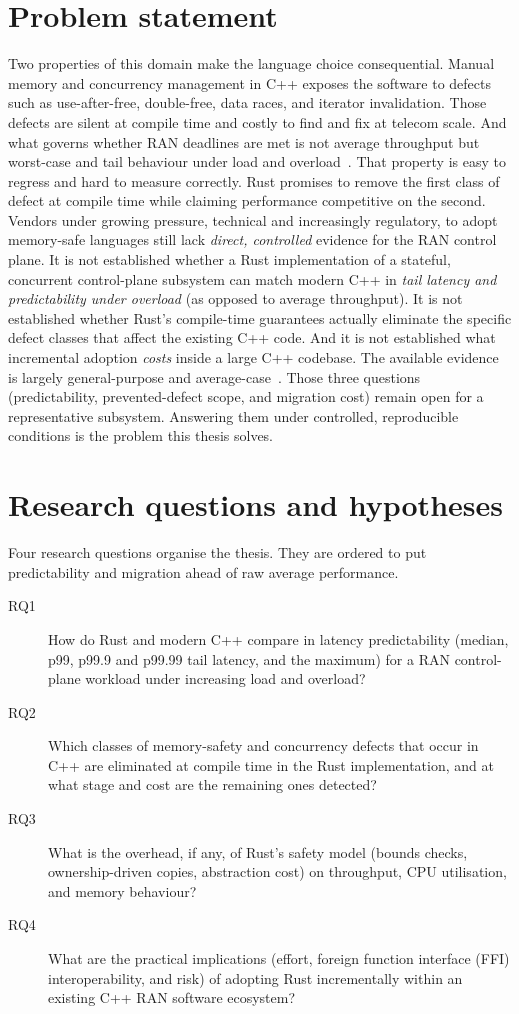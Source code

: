 \documentclass[english,oneside,a4paper,censored,csm,software-track-2020]{HYthesisML}
\begin{document}
\section{Problem statement}
Two properties of this domain make the language choice consequential. Manual memory and
concurrency management in C++ exposes the software to defects such as use-after-free,
double-free, data races, and iterator invalidation. Those defects are silent at compile time and
costly to find and fix at telecom scale. And what governs whether RAN deadlines are met is not
average throughput but worst-case and tail behaviour under load and
overload~\cite{dean2013tail}. That property is easy to regress and hard to measure correctly.
Rust promises to remove the first class of defect at compile time while claiming performance
competitive on the second. Vendors under growing pressure, technical and increasingly
regulatory, to adopt memory-safe languages still lack \emph{direct, controlled} evidence for the
RAN control plane. It is not established whether a Rust implementation of a stateful, concurrent
control-plane subsystem can match modern C++ in \emph{tail latency and predictability under
overload} (as opposed to average throughput). It is not established whether Rust's
compile-time guarantees actually eliminate the specific defect classes that affect the
existing C++ code. And it is not established what incremental adoption \emph{costs} inside a
large C++ codebase. The available evidence is largely general-purpose and
average-case~\cite{balasubramanian2017rust,qin2020rust}. Those three questions (predictability,
prevented-defect scope, and migration cost) remain open for a representative subsystem.
Answering them under controlled, reproducible conditions is the problem this thesis solves.

\section{Research questions and hypotheses}\label{sec:rqs}
Four research questions organise the thesis. They are ordered to put predictability and
migration ahead of raw average performance.

\begin{description}
  \item[RQ1] How do Rust and modern C++ compare in latency predictability (median, p99,
        p99.9 and p99.99 tail latency, and the maximum) for a RAN control-plane workload
        under increasing load and overload?
  \item[RQ2] Which classes of memory-safety and concurrency defects that occur in C++ are
        eliminated at compile time in the Rust implementation, and at what stage and cost
        are the remaining ones detected?
  \item[RQ3] What is the overhead, if any, of Rust's safety model (bounds checks,
        ownership-driven copies, abstraction cost) on throughput, CPU utilisation, and
        memory behaviour?
  \item[RQ4] What are the practical implications (effort, foreign function interface (FFI)
        interoperability, and risk) of adopting Rust incrementally within an existing C++ RAN
        software ecosystem?
\end{description}
\end{document}

